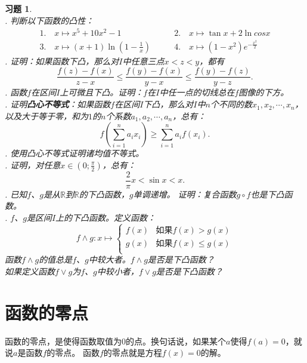 \documentclass[12pt,UTF8]{ctexbook}
\theoremstyle{definition}
\theoremstyle{plain}
\newtheorem{xt}{习题}[section]
\begin{document}
\begin{xt}
    \mbox{} \\
    . 判断以下函数的凸性：
    $$
    \begin{array}{ll}
        1. \quad x \mapsto x^5 + 10x^2 - 1 \qquad &2. \quad x \mapsto \tan{x} + 2\ln{cos{x}} \\
        3. \quad x \mapsto (x+1)\ln{\left(1 - \frac{1}{x}\right)} \qquad &4. \quad x \mapsto \left(1 - x^2\right)e^{-\frac{x^2}{2}}
    \end{array}
    $$
    . 证明：如果函数下凸，那么对$I$中任意三点$x < z < y$，都有
    $$ \frac{f(z) - f(x)}{z - x} \leqslant \frac{f(y) - f(x)}{y - x}  \leqslant \frac{f(y) - f(z)}{y - z}. $$
    . 函数$f$在区间$I$上可微且下凸。证明：$f$在$I$中任一点的切线总在$f$图像的下方。\\
    . 证明\textbf{凸心不等式}：如果函数$f$在区间$I$下凸，那么对$I$中$n$个不同的数$x_1, x_2, \cdots , x_n$，
    以及大于等于零，和为$1$的$n$个系数$a_1, a_2, \cdots, a_n$，总有：
    $$ f\left(\sum_{i=1}^n a_i x_i\right) \geqslant \sum_{i=1}^n a_i f(x_i). $$
    . 使用凸心不等式证明诸均值不等式。\\
    . 证明，对任意$x\in\left(0; \frac{\pi}{2}\right)$，总有：
    $$ \frac{2}{\pi} x < \sin{x} < x.$$
    . 已知$f$、$g$是从$\mathbb{R}$到$\mathbb{R}$的下凸函数，$g$单调递增。
    证明：复合函数$g\circ f$也是下凸函数。\\
    . $f$、$g$是区间$I$上的下凸函数。定义函数：
    $$ f \wedge g : x \mapsto \left\{
        \begin{array}{cl}
            f(x) & \mbox{如果} f(x) > g(x) \\
            g(x) & \mbox{如果} f(x) \leqslant g(x) \\
        \end{array}
    \right.
    $$
    \indent 函数$f \wedge g$的值总是$f$、$g$中较大者。$f \wedge g$是否是下凸函数？\\
    \indent 如果定义函数$f \vee g$为$f$、$g$中较小者，$f \vee g$是否是下凸函数？

\end{xt}

\section{函数的零点}

函数的零点，是使得函数取值为$0$的点。换句话说，如果某个$a$使得$f(a) = 0$，就说$a$是函数$f$的零点。
函数$f$的零点就是方程$f(x) = 0$的解。
\end{document}
